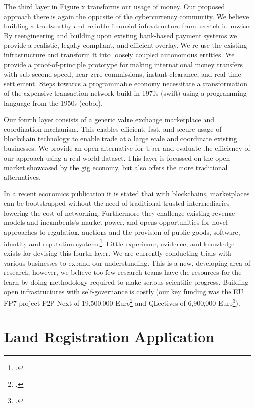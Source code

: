 \documentclass[USenglish]{article}
\begin{document}
The third layer in Figure x transforms our usage of money.
Our proposed approach there is again the opposite of the cybercurrency community.
We believe building a trustworthy and reliable financial infrastructure from scratch is unwise.
By reengineering and building upon existing bank-based payment systems we provide a realistic, legally compliant, and efficient overlay.
We re-use the existing infrastructure and transform it into loosely coupled autonomous entities.
We provide a proof-of-principle prototype for making international money transfers with sub-second speed, near-zero commissions, instant clearance, and real-time settlement. 
Steps towards a programmable economy necessitate a transformation of the expensive transaction network build in 1970s (swift) using a programming language from the 1950s (cobol).

Our fourth layer consists of a generic value exchange marketplace and coordination mechanism.
This enables efficient, fast, and secure usage of blockchain technology to enable trade at a large scale and coordinate existing businesses.
We provide an open alternative for Uber and evaluate the efficiency of our approach using a real-world dataset.
This layer is focussed on the open market showcased by the gig economy, but also offers the more traditional alternatives.

In a recent economics publication it is stated that with blockchains, marketplaces can be bootstrapped without the need of traditional trusted intermediaries, lowering the cost of networking.
Furthermore they challenge existing revenue models and incumbents's market power, and opens opportunities for novel approaches to regulation, auctions and the provision of public goods, software, identity and reputation systems\footcite{catalini2016some}.
Little experience, evidence, and knowledge exists for devising this fourth layer.
We are currently conducting trials with various businesses to expand our understanding.
This is a new, developing area of research, however, we believe too few research teams have the resources for the learn-by-doing methodology required to make serious scientific progress.
Building open infrastructures with self-governance is costly (our key funding was the EU FP7 project P2P-Next of 19,500,000 Euro\footcite{p2pnextfunding} and QLectives of 6,900,000 Euro\footcite{qlectivefunding}).

\section{Land Registration Application}
\end{document}
